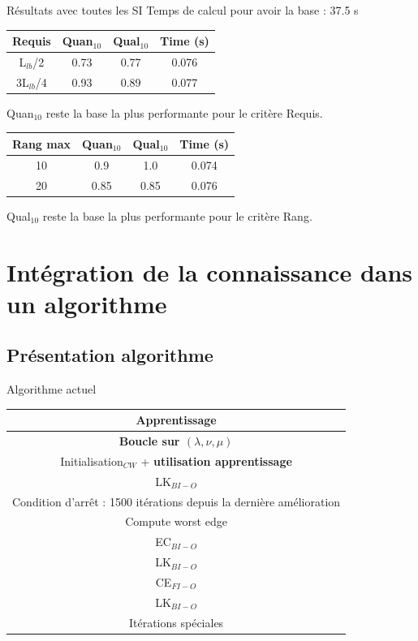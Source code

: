 \documentclass{beamer}
\begin{document}
\begin{frame}{Résultats avec toutes les SI}
Temps de calcul pour avoir la base : 37.5 s

\centering
\begin{tabular}{|c|c|c|c|}
   \hline
   Requis & Quan$_{10}$ & Qual$_{10}$ & Time (s)\\
   \hline
   L$_{lb}$/2 & 0.73 & 0.77 & 0.076 \\
   \hline
   3L$_{lb}$/4 & 0.93 & 0.89  & 0.077 \\
   \hline
\end{tabular}

Quan$_{10}$ reste la base la plus performante pour le critère Requis.

\begin{tabular}{|c|c|c|c|}
   \hline
   Rang max & Quan$_{10}$ & Qual$_{10}$ & Time (s)\\
   \hline
   10 & 0.9 & 1.0 & 0.074 \\
   \hline
   20 & 0.85 & 0.85 & 0.076 \\
   \hline
\end{tabular}

Qual$_{10}$ reste la base la plus performante pour le critère Rang.
\end{frame}

\section{Intégration de la connaissance dans un algorithme}

\subsection{Présentation algorithme}
\begin{frame}{Algorithme actuel}

\begin{center}
\begin{tabular}{|c|}
	\hline
 	\textbf{Apprentissage} \\
   \hline
   \textbf{Boucle sur $(\lambda, \nu, \mu)$} \\
   \hline
   \hline
   Initialisation$_{CW}$ + \textbf{utilisation apprentissage} \\
   \hline
   LK$_{BI-O}$ \\
   \hline
   \hline
   Condition d'arrêt : 1500 itérations depuis la dernière amélioration  \\
   \hline
   Compute worst edge \\
   \hline
   EC$_{BI-O}$ \\
   \hline
   LK$_{BI-O}$ \\
   \hline
   CE$_{FI-O}$ \\
   \hline
   LK$_{BI-O}$ \\
   \hline
   Itérations spéciales \\
   \hline
   \hline

\end{tabular}
\end{center}
\end{frame}
\end{document}
